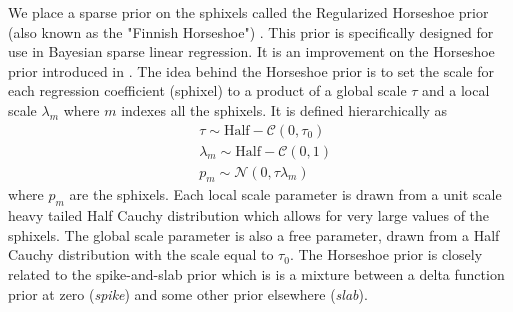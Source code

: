 \documentclass[modern]{aastex62}
\begin{document}
We place a sparse prior on the sphixels called the Regularized Horseshoe prior (also known as the "Finnish Horseshoe") \citep{piironen2017}. 
This prior is specifically designed for use in Bayesian sparse linear regression. 
It is an improvement on the Horseshoe prior introduced in \cite{carvalho2010}.
The idea behind the Horseshoe prior is to set the scale for each regression coefficient (sphixel) to a product of a global scale $\tau$ and a local scale $\lambda_m$ where $m$ indexes all the sphixels.
It is defined hierarchically as 
\begin{equation}
\begin{aligned}
    &\tau  \sim \mathrm{Half}-\mathcal{C} \left(0, \tau_{0}\right)\\
    &\lambda_{m}  \sim \mathrm{Half}-\mathcal{C} (0,1) \\
    &p_{m}  \sim \mathcal{N}\left(0, \tau \lambda_{m}\right) 
\end{aligned}
    \label{eq:horseshoe}
\end{equation}
where $p_m$ are the sphixels.
Each local scale parameter is drawn from a unit scale heavy tailed Half Cauchy distribution which allows for very large values of the sphixels.
The global scale parameter is also a free parameter, drawn from a Half Cauchy distribution with the scale equal to $\tau_0$.
The Horseshoe prior is closely related to the spike-and-slab prior which is is a mixture between a delta function prior at zero (\emph{spike}) and some other prior elsewhere (\emph{slab}).
\end{document}
